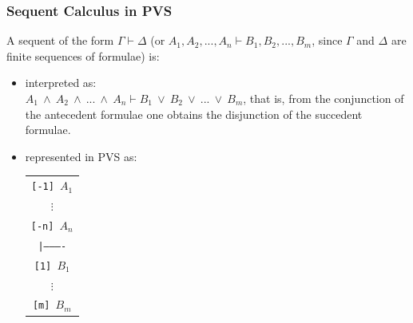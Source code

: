 \documentclass[10pt]{beamer}
\newcommand{\AND}{\ {\wedge}\ }
\newcommand{\OR}{\ {\vee}\ }
\begin{document}
\begin{frame}
\frametitle{Sequent Calculus in PVS}
A sequent of the form {\color{red} $\Gamma\vdash\Delta$} (or {\color{red}$A_1,A_2,...,A_n\vdash
B_1,B_2,...,B_m$}, since $\Gamma$ and $\Delta$ are finite sequences
of formulae) is:
\vspace{.2cm}

{\small
 \begin{minipage}{.53\textwidth}
        \begin{itemize}
\item interpreted as: \\{\footnotesize{\color{red}$A_1\AND A_2\AND ...\AND A_n\vdash
    B_1\OR B_2\OR ...\OR B_m$}}, that is, from the conjunction of the
  antecedent formulae one obtains the disjunction of the succedent
  formulae. 
\end{itemize}
\end{minipage}%
}
\hfill\vline\hfill
{\small
 \begin{minipage}{.43\textwidth}
        \begin{itemize}
\item represented in PVS as: 
	{\color{blue}\begin{center}
			\begin{tabular}{c}
				\small{\tt{[-1] $A_1$}} \\ \small{\tt{$\vdots$}} \\ \small{\tt{[-n] $A_n$}} \\ \small{\tt{|----------}}
				\\ \small{\tt{[1] $B_1$}} \\ \small{\tt{$\vdots$}} \\ \small{\tt{[m] $B_m$}}
			\end{tabular} 
		\end{center}}
\end{itemize}
\end{minipage}%
}

\end{frame}
\end{document}
